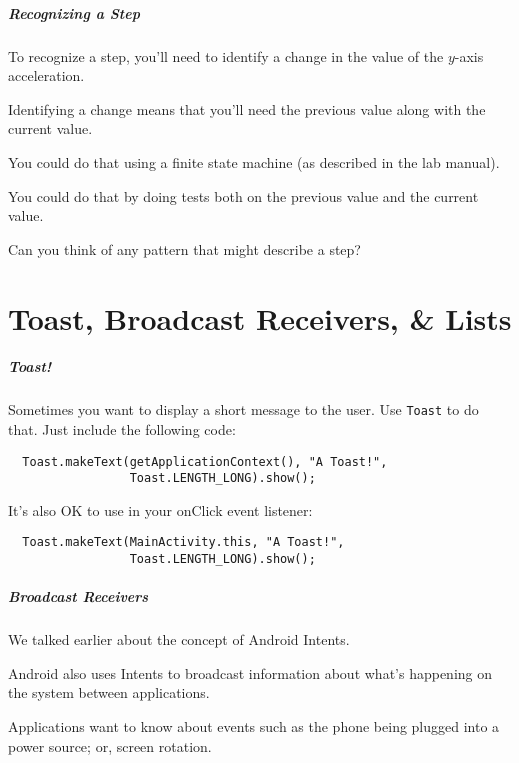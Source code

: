 \begin{frame}
\frametitle{Recognizing a Step}
\begin{changemargin}{1cm}

To recognize a step, you'll need to identify a change in the value of the $y$-axis
acceleration. 

Identifying a change means that you'll need the previous value along
with the current value. 

You could do that using a finite state machine (as described
in the lab manual). 

You could do that by doing tests both on the previous value 
and the current value. 

Can you think of any pattern that might describe a step?

\end{changemargin}
\end{frame}


\part{Toast, Broadcast Receivers, \& Lists}
\frame{\partpage}

\begin{frame}[fragile]
\frametitle{Toast!}
\begin{changemargin}{1cm}

 Sometimes you want to display a short message to the user.
Use {\tt Toast} to do that. Just include the following code:
\begin{lstlisting}
  Toast.makeText(getApplicationContext(), "A Toast!", 
                 Toast.LENGTH_LONG).show();
\end{lstlisting}
It's also OK to use in your onClick event listener:
\begin{lstlisting}
  Toast.makeText(MainActivity.this, "A Toast!", 
                 Toast.LENGTH_LONG).show();
\end{lstlisting}


\end{changemargin}
\end{frame}


\begin{frame}
\frametitle{Broadcast Receivers}
\begin{changemargin}{1cm}

We talked earlier about the concept of Android Intents.

Android also uses Intents to broadcast information about what's
happening on the system between applications. 

Applications want to
know about events such as the phone being plugged into a power source;
or, screen rotation.


\end{changemargin}
\end{frame}

